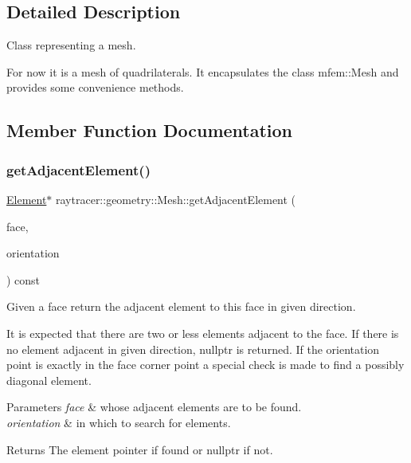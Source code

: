 \subsection{Detailed Description}
Class representing a mesh. 

For now it is a mesh of quadrilaterals. It encapsulates the class mfem\+::\+Mesh and provides some convenience methods. 

\subsection{Member Function Documentation}
\mbox{\label{classraytracer_1_1geometry_1_1Mesh_abc14a8ac714460926e8f2bcacdf49cbd}} 
\subsubsection{\texorpdfstring{get\+Adjacent\+Element()}{getAdjacentElement()}}
{\footnotesize\ttfamily \hyperlink{classraytracer_1_1geometry_1_1Element}{Element}$\ast$ raytracer\+::geometry\+::\+Mesh\+::get\+Adjacent\+Element (\begin{DoxyParamCaption}\item[{const \hyperlink{classraytracer_1_1geometry_1_1Face}{Face} $\ast$}]{face,  }\item[{const \hyperlink{structraytracer_1_1geometry_1_1HalfLine}{Half\+Line} \&}]{orientation }\end{DoxyParamCaption}) const}



Given a face return the adjacent element to this face in given direction. 

It is expected that there are two or less elements adjacent to the face. If there is no element adjacent in given direction, nullptr is returned. If the orientation point is exactly in the face corner point a special check is made to find a possibly diagonal element. 
\begin{DoxyParams}{Parameters}
{\em face} & whose adjacent elements are to be found. \\
\hline
{\em orientation} & in which to search for elements. \\
\hline
\end{DoxyParams}
\begin{DoxyReturn}{Returns}
The element pointer if found or nullptr if not. 
\end{DoxyReturn}
\mbox{\label{classraytracer_1_1geometry_1_1Mesh_a0fcef1d3e48815807ea6b498d3c45b1b}} 
